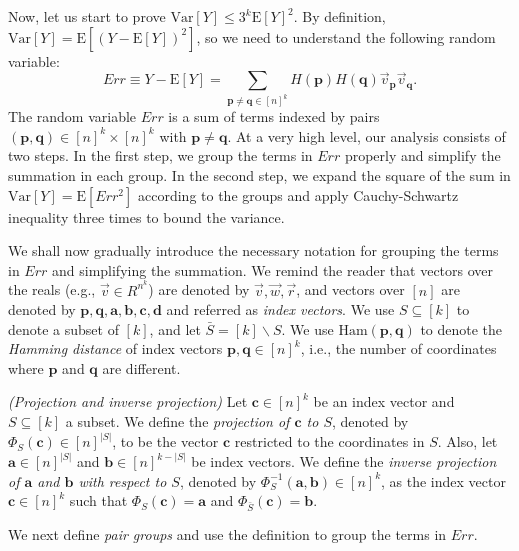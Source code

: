 \def\draft{0}  \documentclass[proceedings]{stacs}
\theoremstyle{plain}\newtheorem{satz}[thm]{Satz}
\theoremstyle{definition}\newtheorem{crucial}[thm]{Crucial Definition}
\newcommand{\vecv}{{\vec{v}} }
\newcommand{\barS}{{\bar{S}} }
\newcommand{\bfp}{{\mathbf p} }
\newcommand{\bfq}{{\mathbf q} }
\newcommand{\bfa}{{\mathbf a} }
\newcommand{\bfb}{{\mathbf b} }
\newcommand{\bfc}{{\mathbf c} }
\newcommand{\bfd}{{\mathbf d} }
\newcommand{\Var}{{\mathrm{Var}} }
\newcommand{\E}{{\mathrm{E}} }
\begin{document}
Now, let us start to prove $\Var[Y] \leq 3^k \mathrm E[Y]^2$. By definition, $\Var[Y] = \mathrm E[ (Y- \E[Y])^2]$, so we need to understand the following random variable:
\begin{equation}\label{eq:X defined}
Err \equiv Y - \E[Y] = \sum_{\bfp \neq \bfq\in [n]^k} H(\bfp)H(\bfq)\vecv_{\bfp}\vecv_{\bfq}.
\end{equation}
The random variable $Err$ is a sum of terms indexed by pairs $(\bfp,\bfq) \in [n]^k \times [n]^k$ with $\bfp \neq \bfq$. At a very high level, our analysis consists of two steps. In the first step, we group the terms in $Err$ properly and simplify the summation in each group. In the second step,  we expand the square of the sum in $\Var[Y] = \mathrm E[Err^2]$ according to the groups and apply Cauchy-Schwartz inequality three times to bound the variance.





We shall now gradually introduce the necessary notation for grouping the terms in $Err$ and simplifying the summation. We remind the reader that vectors over the reals (e.g., $\vecv \in R^{n^k}$) are denoted by $\vecv, \vec{w},\vec{r}$, and vectors over $[n]$ are denoted by $\bfp,\bfq,\bfa,\bfb,\bfc,\bfd$ and referred as \emph{index vectors}.  We use $S\subseteq [k]$ to denote a subset of $[k]$, and let $\barS = [k] \backslash S$. We use $\mathrm{Ham}(\bfp, \bfq)$ to denote the \emph{Hamming distance} of index vectors $\bfp,\bfq \in [n]^k$, i.e., the number of coordinates where $\bfp$ and $\bfq$ are different. 



\begin{definition}\label{def:projection} \emph{(Projection and inverse projection)} Let $\bfc \in [n]^k$ be an index vector and $S \subseteq [k]$ a subset. We define the \emph{projection of $\bfc$ to $S$}, denoted by $\Phi_S(\bfc) \in [n]^{|S|}$, to be the vector $\bfc$ restricted to the coordinates in $S$.
Also, let $\bfa \in [n]^{|S|}$ and $\bfb \in [n]^{k - |S|}$ be index vectors. We define the \emph{inverse projection of $\bfa$ and $\bfb$ with respect to $S$}, denoted by $\Phi^{-1}_{S}(\bfa, \bfb) \in [n]^k$, as the index vector $\bfc \in [n]^k$ such that $\Phi_{S}(\bfc) = \bfa$ and $\Phi_{\barS}(\bfc) = \bfb$.
\end{definition}



We next define \emph{pair groups} and use the definition to group the terms in $Err$.
\end{document}

